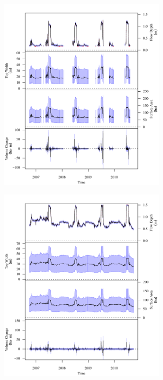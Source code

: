 \begin{linenumbers}
\subfiguretop
\begin{landscape}
	\begin{figure}
		\begin{subfigure}{0.7\textwidth}
			\centering
			\includegraphics[width=0.9\textwidth]{"Figures/Results_DSR/Stochastic/G TS F"}
			\label{sub:GeoTS_F}
		\end{subfigure}%
		\begin{subfigure}{0.7\textwidth}
			\centering
			\includegraphics[width=0.9\textwidth]{"Figures/Results_DSR/Stochastic/G TS G"}

\end{subfigure}
\end{figure}
\end{landscape}
\end{linenumbers}
